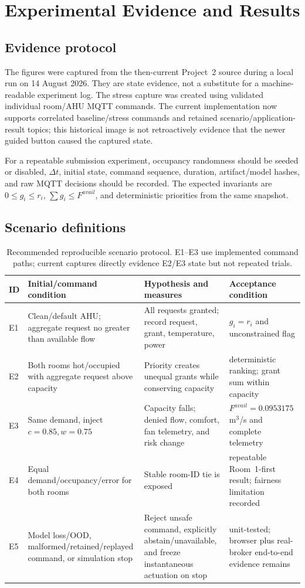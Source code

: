 \chapter{Experimental Evidence and Results}
\label{ch:results}

\section{Evidence protocol}
The figures were captured from the then-current Project~2 source during a local run on 14 August 2026. They are state evidence, not a substitute for a machine-readable experiment log. The stress capture was created using validated individual room/AHU MQTT commands. The current implementation now supports correlated  baseline/stress commands and retained scenario/application-result topics; this historical image is not retroactively evidence that the newer guided button caused the captured state.

For a repeatable submission experiment, occupancy randomness should be seeded or disabled, $\Delta t$, initial state, command sequence, duration, artifact/model hashes, and raw MQTT decisions should be recorded. The expected invariants are $0\le g_i\le r_i$, $\sum g_i\le F^{avail}$, and deterministic priorities from the same snapshot.

\section{Scenario definitions}
\begin{table}[H]
\centering
\caption{Recommended reproducible scenario protocol. E1--E3 use implemented command paths; current captures directly evidence E2/E3 state but not repeated trials.}
\begin{tabularx}{\textwidth}{L{0.08\textwidth}Y Y Y}
\toprule
ID & Initial/command condition & Hypothesis and measures & Acceptance condition\\
\midrule
E1 & Clean/default AHU; aggregate request no greater than available flow & All requests granted; record request, grant, temperature, power & $g_i=r_i$ and unconstrained flag\\
E2 & Both rooms hot/occupied with aggregate request above capacity & Priority creates unequal grants while conserving capacity & deterministic ranking; grant sum within capacity\\
E3 & Same demand, inject $c=0.85,w=0.75$ & Capacity falls; denied flow, comfort, fan telemetry, and risk change & $F^{avail}=0.0953175$ m$^3$/s and complete telemetry\\
E4 & Equal demand/occupancy/error for both rooms & Stable room-ID tie is exposed & repeatable Room~1-first result; fairness limitation recorded\\
E5 & Model loss/OOD, malformed/retained/replayed command, or simulation stop & Reject unsafe command, explicitly abstain/unavailable, and freeze instantaneous actuation on stop & unit-tested; browser plus real-broker end-to-end evidence remains\\
\bottomrule
\end{tabularx}
\end{table}

